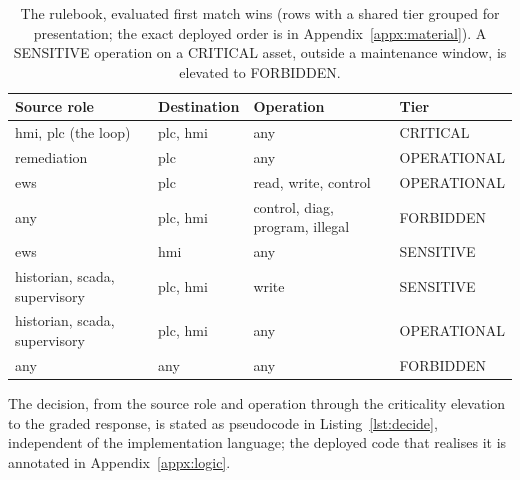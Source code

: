 \begin{table}[t]
\centering
\begin{tabular}{lll l}
\hline
Source role & Destination & Operation & Tier \\
\hline
hmi, plc (the loop) & plc, hmi & any & CRITICAL \\
remediation & plc & any & OPERATIONAL \\
ews & plc & read, write, control & OPERATIONAL \\
any & plc, hmi & control, diag, program, illegal & FORBIDDEN \\
ews & hmi & any & SENSITIVE \\
historian, scada, supervisory & plc, hmi & write & SENSITIVE \\
historian, scada, supervisory & plc, hmi & any & OPERATIONAL \\
any & any & any & FORBIDDEN \\
\hline
\end{tabular}
\caption[The rulebook]{The rulebook, evaluated first match wins (rows with a shared tier grouped for presentation; the exact deployed order is in Appendix~\ref{appx:material}). A SENSITIVE operation on a CRITICAL asset, outside a maintenance window, is elevated to FORBIDDEN.}
\label{tab:rulebook}
\end{table}

The decision, from the source role and operation through the criticality elevation to the graded response, is stated as pseudocode in Listing~\ref{lst:decide}, independent of the implementation language; the deployed code that realises it is annotated in Appendix~\ref{appx:logic}.

